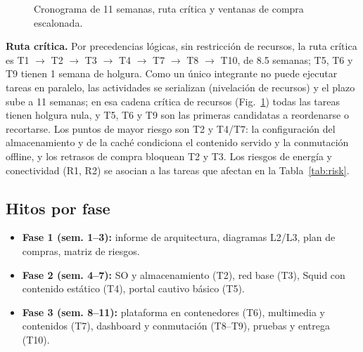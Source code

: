 \documentclass[conference]{IEEEtran}
\begin{document}
\begin{figure}[t]
\centering
{}
\caption{Cronograma de 11 semanas, ruta crítica y ventanas de compra escalonada.}
\label{fig:gantt}
\end{figure}

\textbf{Ruta crítica.} Por precedencias lógicas, sin restricción de recursos, la ruta crítica es T1 $\to$ T2 $\to$ T3 $\to$ T4 $\to$ T7 $\to$ T8 $\to$ T10, de 8.5 semanas; T5, T6 y T9 tienen 1 semana de holgura. Como un único integrante no puede ejecutar tareas en paralelo, las actividades se serializan (nivelación de recursos) y el plazo sube a 11 semanas; en esa cadena crítica de recursos (Fig.~\ref{fig:gantt}) todas las tareas tienen holgura nula, y T5, T6 y T9 son las primeras candidatas a reordenarse o recortarse. Los puntos de mayor riesgo son T2 y T4/T7: la configuración del almacenamiento y de la caché condiciona el contenido servido y la conmutación offline, y los retrasos de compra bloquean T2 y T3. Los riesgos de energía y conectividad (R1, R2) se asocian a las tareas que afectan en la Tabla~\ref{tab:risk}.

\subsection{Hitos por fase}
\begin{itemize}
  \item \textbf{Fase 1 (sem. 1--3):} informe de arquitectura, diagramas L2/L3, plan de compras, matriz de riesgos.
  \item \textbf{Fase 2 (sem. 4--7):} SO y almacenamiento (T2), red base (T3), Squid con contenido estático (T4), portal cautivo básico (T5).
  \item \textbf{Fase 3 (sem. 8--11):} plataforma en contenedores (T6), multimedia y contenidos (T7), dashboard y conmutación (T8--T9), pruebas y entrega (T10).
\end{itemize}
\end{document}
